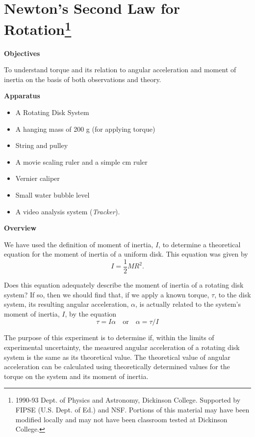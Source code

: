 
\section{Newton's Second Law for Rotation\footnote{
1990-93 Dept. of Physics and Astronomy, Dickinson College. Supported by FIPSE
(U.S. Dept. of Ed.) and NSF. Portions of this material may have been modified
locally and may not have been classroom tested at Dickinson College.
}}

\makelabheader %

\textbf{Objectives} 

To understand torque and its relation to angular acceleration and moment of
inertia on the basis of both observations and theory. 

\textbf{Apparatus}

\begin{itemize}
\item A Rotating Disk System 
\item A hanging mass of 200 g (for applying torque) 
\item String and pulley
\item A movie scaling ruler and a simple cm ruler
\item Vernier caliper
\item Small water bubble level
\item A video analysis system (\textit{Tracker}).
\end{itemize}
\textbf{Overview} 

We have used the definition of moment of inertia, $I$, to determine a theoretical equation for the moment of inertia of a uniform disk. This equation was given by
\[
I=\frac{1}{2}MR^{2}.\]


Does this equation adequately describe the moment of inertia of a rotating
disk system? If so, then we should find that, if we apply a known torque, \( \tau  \), to the disk system, its resulting angular acceleration, \( \alpha  \), is actually related to the system's moment of inertia, $I$, by the equation
\[
\tau =I\alpha \quad \mbox{or}\quad \alpha =\tau /I\]


The purpose of this experiment is to determine if, within the limits of experimental
uncertainty, the measured angular acceleration of a rotating disk system is
the same as its theoretical value. The theoretical value of angular acceleration can be calculated using theoretically determined values for the torque on the
system and its moment of inertia.

